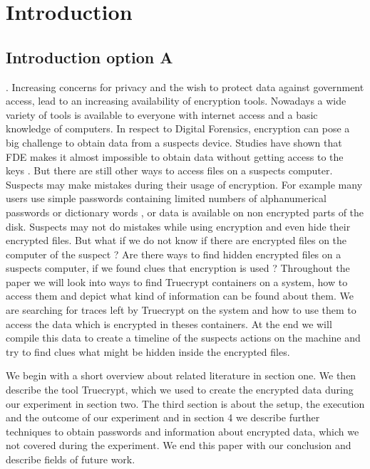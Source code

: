 \section{Introduction}
\subsection{Introduction option A}.
Increasing concerns for privacy and the wish to protect data against government access, lead to an increasing availability of encryption tools. Nowadays a wide variety of tools is available to everyone with internet access and a basic knowledge of computers.
In respect to Digital Forensics, encryption can pose a big challenge to obtain data from a suspects device. Studies have shown that \gls{FDE} makes it almost impossible to obtain data without getting access to the keys \cite{Casey2011129}. But there are still other ways to access files on a suspects computer. Suspects may make mistakes during their usage of encryption. For example many users use simple passwords containing limited numbers of alphanumerical passwords or dictionary words \cite{worstpractise}, or data is available on non encrypted parts of the disk. Suspects may not do mistakes while using encryption and even hide their encrypted files.
But what if we do not know if there are encrypted files on the computer of the suspect ? Are there ways to find hidden encrypted files on a suspects computer, if we found clues that encryption is used ? Throughout the paper we will look into ways to find Truecrypt containers on a system, how to access them and depict what kind of information can be found about them. We are searching for traces left by Truecrypt on the system and how to use them to access the data which is encrypted in theses containers.
At the end we will compile this data to create a timeline of the suspects actions on the machine and try to find clues what might be hidden inside the encrypted files. 

We begin with a short overview about related literature in section one. We then describe the tool Truecrypt, which we used to create the encrypted data during our experiment in section two. The third section is about the setup, the execution and the outcome of our experiment and in section 4 we describe further techniques to obtain passwords and information about encrypted data, which we not covered during the experiment. We end this paper with our conclusion and describe fields of future work.

